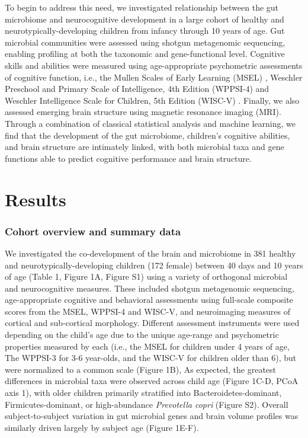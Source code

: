 \documentclass{article}
\begin{document}
To begin to address this need, we investigated relationship between
the gut microbiome and
neurocognitive development in a large cohort of healthy and neurotypically-developing
children from infancy through 10 years of age. Gut microbial
communities were assessed using shotgun metagenomic sequencing, enabling
profiling at both the taxonomic and gene-functional level.
Cognitive skills and abilities were measured using age-appropriate
psychometric assessments of cognitive function, i.e.,
the Mullen Scales of Early Learning (MSEL) \cite{mullenMullenScalesEarly1995},
Weschler Preschool and Primary Scale of Intelligence, 4th Edition (WPPSI-4) 
\cite{wechslerWechslerPreschoolPrimary2012}
and Weschler Intelligence Scale for Children, 5th Edition (WISC-V)
\cite{wechslerWechslerIntelligenceScale1949}.
Finally, we also assessed emerging brain structure using magnetic resonance imaging
(MRI). Through a combination of classical statistical analysis and machine
learning, we find that the development of the gut microbiome,
children's cognitive abilities, and brain structure are intimately linked, with
both microbial taxa and gene functions able to predict cognitive
performance and brain structure.

\section*{Results}

\subsubsection*{Cohort overview and summary data}

We investigated the co-development of the brain and microbiome in
381 healthy and neurotypically-developing children (172 female) between 40 days and 10 years of age
(Table 1,  Figure 1A, Figure S1)
using a variety of orthogonal microbial and neurocognitive measures.
These included shotgun metagenomic sequencing,
age-appropriate cognitive and behavioral assessments
using full-scale composite scores from the MSEL, WPPSI-4 and WISC-V,
and neuroimaging measures of cortical and sub-cortical morphology. 
Different assessment instruments were used depending on the child's age
due to the unique age-range and psychometric properties measured by each
(i.e., the MSEL for children under 4 years of age, The WPPSI-3 for 3-6 year-olds,
and the WISC-V for children older than 6), but were normalized to a common scale (Figure 1B),
As expected, the greatest differences in microbial taxa were observed across
child age (Figure 1C-D, PCoA axis 1), with older children primarily
stratified into Bacteroidetes-dominant, Firmicutes-dominant, or
high-abundance \emph{Prevotella copri} (Figure S2).
Overall subject-to-subject variation in gut microbial genes
and brain volume profiles was similarly driven largely by subject age (Figure 1E-F).
\end{document}
